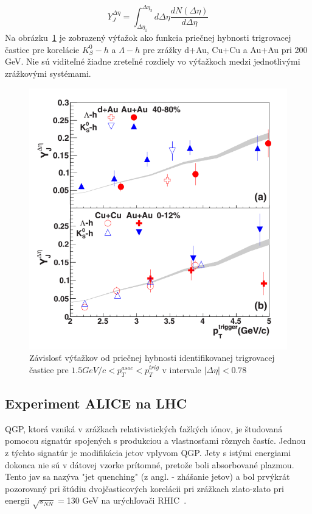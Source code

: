 \documentclass[thesismargins, thesislinespacing]{rnthesis}
\begin{document}
\begin{equation}
Y^{\Delta\eta}_J=\int_{\Delta\eta_1}^{\Delta\eta_2}d\Delta\eta \frac{dN(\Delta\eta)}{d\Delta\eta}
\end{equation}
Na obrázku~\ref{clanokstar} je zobrazený výťažok ako funkcia priečnej hybnosti trigrovacej častice pre korelácie $K_S^0 - h$ a $\Lambda-h$ pre zrážky d+Au, Cu+Cu a Au+Au pri 200 GeV. Nie sú viditeľné žiadne zreteľné rozdiely vo výťažkoch medzi jednotlivými zrážkovými systémami. 

\begin{figure}[hbtp!]
	\centering
	\includegraphics[scale=0.5]{./Obrazky_praca/clanokstar.png}
	\caption{Závislosť výťažkov od priečnej hybnosti identifikovanej trigrovacej častice pre $1.5 GeV/c <p_T^{asoc}<p_T^{trig}$ v intervale $|\Delta\eta|<0.78$ ~\cite{clanokstar}}
	\label{clanokstar}
\end{figure}

\subsection{Experiment ALICE na LHC}
QGP, ktorá vzniká v zrážkach relativistických ťažkých iónov, je študovaná pomocou signatúr spojených s produkciou a vlastnosťami rôznych častíc. Jednou z týchto signatúr je modifikácia jetov vplyvom QGP. Jety s istými energiami dokonca nie sú v dátovej vzorke prítomné, pretože boli absorbované plazmou. Tento jav sa nazýva "jet quenching" (z angl. - zhášanie jetov) a bol prvýkrát pozorovaný pri štúdiu dvoj\-čas\-ti\-co\-vých korelácii pri zrážkach zlato-zlato pri energii $\sqrt{s_{NN}}=$130 GeV na urýchľovači RHIC~\cite{rhic}.
\end{document}
